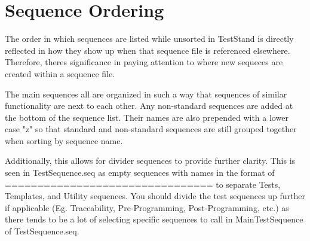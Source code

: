 \chapter{Sequence Ordering }
\hypertarget{seqorder}{}\label{seqorder}
The order in which sequences are listed while unsorted in Test\+Stand is directly reflected in how they show up when that sequence file is referenced elsewhere. Therefore, there\textquotesingle{}s significance in paying attention to where new sequeces are created within a sequence file.

The main sequences all are organized in such a way that sequences of similar functionality are next to each other. Any non-\/standard sequences are added at the bottom of the sequence list. Their names are also prepended with a lower case "{}z"{} so that standard and non-\/standard sequences are still grouped together when sorting by sequence name.

Additionally, this allows for divider sequences to provide further clarity. This is seen in Test\+Sequence.seq as empty sequences with names in the format of {\ttfamily ================\+[Label]\+================} to separate Tests, Templates, and Utility sequences. You should divide the test sequences up further if applicable (Eg. Traceability, Pre-\/\+Programming, Post-\/\+Programming, etc.) as there tends to be a lot of selecting specific sequences to call in Main\+Test\+Sequence of Test\+Sequence.\+seq. 